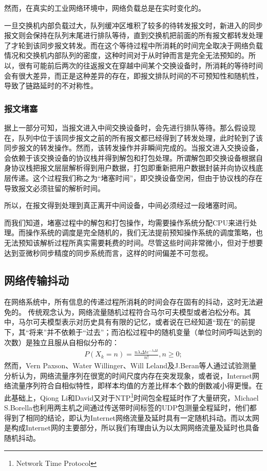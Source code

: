 然而，在真实的工业网络环境中，网络负载总是在实时变化的。

一旦交换机内部负载过大，队列缓冲区堆积了较多的待转发报文时，新进入的同步报文则会保持在队列末尾进行排队等待，直到交换机把前面的所有报文都转发处理了才轮到该同步报文转发。而在这个等待过程中所消耗的时间完全取决于网络负载情况和交换机内部队列的密度，这种时间对于从时钟而言是完全无法预知的。所以，很有可能前后两次的往返报文在穿越中间某个交换设备时，所消耗的等待时间会有很大差异，而正是这种差异的存在，即报文排队时间的不可预知性和随机性，导致了链路延时的不对称性。

\subsubsection{报文堵塞}
据上一部分可知，当报文进入中间交换设备时，会先进行排队等待。那么假设现在，队列中位于该同步报文之前的所有报文都已经得到了转发处理，此时轮到了该同步报文的转发操作。然而，该转发操作并非瞬间完成的。当报文进入交换设备，会依赖于该交换设备的协议栈并得到解包和打包处理。所谓解包即交换设备根据自身协议栈把报文层层解析得到用户数据，打包即重新把用户数据封装并向协议栈底层传递。这个过程我们称之为“堵塞时间”，即交换设备空闲，但由于协议栈的存在导致报文必须驻留的解析时间。

所以，在报文得到处理到真正离开中间设备，中间必须经过一段堵塞时间。

而我们知道，堵塞过程中的解包和打包操作，均需要操作系统分配CPU来进行处理。而操作系统的调度是完全随机的，我们无法提前预知操作系统的调度策略，也无法预知该解析过程所真实需要耗费的时间。尽管这些时间非常微小，但对于想要达到亚微秒同步精度的同步系统而言，这样的时间偏差不可忽视。

\subsection{网络传输抖动}
在网络系统中，所有信息的传递过程所消耗的时间会存在固有的抖动，这时无法避免的。
传统观念认为，网络流量随机过程符合马尔可夫模型或者泊松分布。其中，马尔可夫模型表示对历史具有有限的记忆，或者说在已经知道“现在”的前提下，其“将来”并不依赖于“过去”；而泊松过程中的随机变量（单位时间呼叫达到的次数）是独立且服从自相似分布的：
\begin {align}
P(X_{k} = n) = \frac{n\lambda\Delta t e^{- \lambda\Delta t}}{n!},n\geq 0;
\end{align}
然而，Vern Paxson\supercite{13}、Water Willinger\supercite{14}、Will Leland\supercite{15}及J.Beran\supercite{16}等人通过试验测量分析认为，网络流量序列在很宽的时间尺度内存在突发现象，或者说，Internet网络流量序列符合自相似特性，即样本均值的方差比样本个数的倒数减小得更慢。在此基础上，Qiong Li和David\supercite{17}又对于NTP\footnote{Network Time Protocol}时间包全程延时作了大量研究，Michael S.Borella\supercite{18}也利用两主机之间通过传送带时间标签的UDP包测量全程延时，他们都得到了相同的结论，即认为Internet网络流量及延时具有一定随机抖动。而以太网是构成Internet网的主要部分，所以我们有理由认为以太网网络流量及延时也具备随机抖动。

